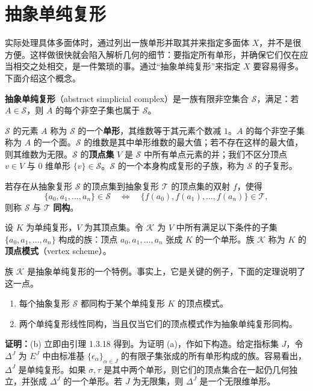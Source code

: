 \section{抽象单纯复形}
实际处理具体多面体时，通过列出一族单形并取其并来指定多面体 $X$，并不是很方便。这样做很快就会陷入解析几何的细节：要指定所有单形，并确保它们仅在应当相交之处相交，是一件繁琐的事。通过“抽象单纯复形”来指定 $X$ 要容易得多。下面介绍这个概念。

\textbf{抽象单纯复形}（abstract simplicial complex）是一族有限非空集合 $\mathcal S$，满足：若 $A\in\mathcal S$，则 $A$ 的每个非空子集也属于 $\mathcal S$。

$\mathcal S$ 的元素 $A$ 称为 $\mathcal S$ 的一个\textbf{单形}，其维数等于其元素个数减 $1$。$A$ 的每个非空子集称为 $A$ 的一个面。$\mathcal S$ 的维数是其中单形维数的最大值；若不存在这样的最大值，则其维数为无限。$\mathcal S$ 的\textbf{顶点集} $V$ 是 $\mathcal S$ 中所有单点元素的并；我们不区分顶点 $v\in V$ 与 $0$ 维单形 $\{v\}\in\mathcal S$。$\mathcal S$ 的一个本身构成复形的子族，称为 $\mathcal S$ 的子复形。

若存在从抽象复形 $\mathcal S$ 的顶点集到抽象复形 $\mathcal T$ 的顶点集的双射 $f$，使得
\[
\{a_0,a_1,\ldots,a_n\}\in\mathcal S
\quad\Longleftrightarrow\quad
\{f(a_0),f(a_1),\ldots,f(a_n)\}\in\mathcal T,
\]
则称 $\mathcal S$ 与 $\mathcal T$ \textbf{同构}。

设 $K$ 为单纯复形，$V$ 为其顶点集。令 $\mathcal K$ 为 $V$ 中所有满足以下条件的子集 $\{a_0,a_1,\ldots,a_n\}$ 构成的族：顶点 $a_0,a_1,\ldots,a_n$ 张成 $K$ 的一个单形。族 $\mathcal K$ 称为 $K$ 的\textbf{顶点模式}（vertex scheme）。

族 $\mathcal K$ 是抽象单纯复形的一个特例。事实上，它是关键的例子，下面的定理说明了这一点。

\begin{enumerate}[label=(\alph*)]
\item 每个抽象复形 $\mathcal S$ 都同构于某个单纯复形 $K$ 的顶点模式。
\item 两个单纯复形线性同构，当且仅当它们的顶点模式作为抽象单纯复形同构。
\end{enumerate}
\noindent\textbf{证明：}(b) 立即由引理 1.3.18 得到。为证明 (a)，作如下构造。给定指标集 $J$，令 $\Delta^J$ 为 $E^J$ 中由标准基 $\{\epsilon_\alpha\}_{\alpha\in J}$ 的有限子集张成的所有单形构成的族。容易看出，$\Delta^J$ 是单纯复形。如果 $\sigma,\tau$ 是其中两个单形，则它们的顶点集合在一起仍几何独立，并张成 $\Delta^J$ 的一个单形。若 $J$ 为无限集，则 $\Delta^J$ 是一个无限维单形。

